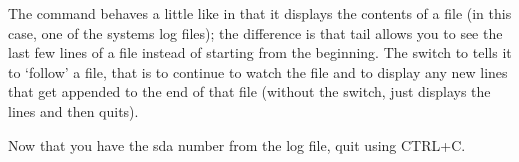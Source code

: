 The  command behaves a little like  in that it displays the contents of a file (in this case, one of the systems log files); the difference is that tail allows you to see the last few lines of a file instead of starting from the beginning. The  switch to  tells it to `follow' a file, that is to continue to watch the file and to display any new lines that get appended to the end of that file (without the switch,  just displays the lines and then quits). 

Now that you have the sda number from the log file, quit  using CTRL+C.


